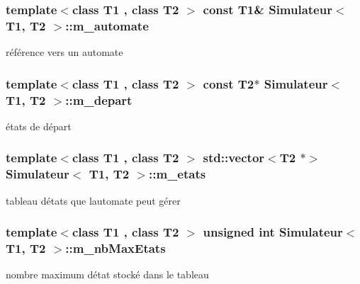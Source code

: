 \subsubsection[{\texorpdfstring{m\+\_\+automate}{m_automate}}]{\setlength{\rightskip}{0pt plus 5cm}template$<$class T1 , class T2 $>$ const T1\& {\bf Simulateur}$<$ T1, T2 $>$\+::m\+\_\+automate\hspace{0.3cm}{\ttfamily [private]}}\hypertarget{class_simulateur_a90182aefba76d1a43060fe608d493398}{}\label{class_simulateur_a90182aefba76d1a43060fe608d493398}
référence vers un automate 
\subsubsection[{\texorpdfstring{m\+\_\+depart}{m_depart}}]{\setlength{\rightskip}{0pt plus 5cm}template$<$class T1 , class T2 $>$ const T2$\ast$ {\bf Simulateur}$<$ T1, T2 $>$\+::m\+\_\+depart\hspace{0.3cm}{\ttfamily [private]}}\hypertarget{class_simulateur_a8f024dcb44d5688aac1fdbc7df531104}{}\label{class_simulateur_a8f024dcb44d5688aac1fdbc7df531104}
états de départ 
\subsubsection[{\texorpdfstring{m\+\_\+etats}{m_etats}}]{\setlength{\rightskip}{0pt plus 5cm}template$<$class T1 , class T2 $>$ std\+::vector$<$T2 $\ast$$>$ {\bf Simulateur}$<$ T1, T2 $>$\+::m\+\_\+etats\hspace{0.3cm}{\ttfamily [private]}}\hypertarget{class_simulateur_a9156b165b5affe1b4627ff66802cfc99}{}\label{class_simulateur_a9156b165b5affe1b4627ff66802cfc99}
tableau d\textquotesingle{}états que l\textquotesingle{}automate peut gérer 
\subsubsection[{\texorpdfstring{m\+\_\+nb\+Max\+Etats}{m_nbMaxEtats}}]{\setlength{\rightskip}{0pt plus 5cm}template$<$class T1 , class T2 $>$ unsigned int {\bf Simulateur}$<$ T1, T2 $>$\+::m\+\_\+nb\+Max\+Etats\hspace{0.3cm}{\ttfamily [private]}}\hypertarget{class_simulateur_aee6fbe615a412a23aafe23d5b6487eec}{}\label{class_simulateur_aee6fbe615a412a23aafe23d5b6487eec}
nombre maximum d\textquotesingle{}état stocké dans le tableau 
